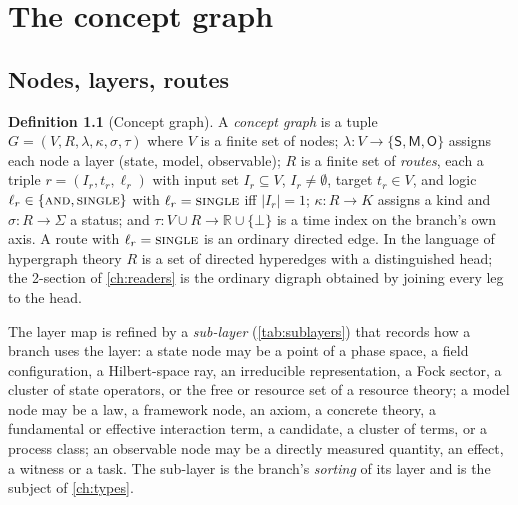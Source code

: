 \documentclass[11pt,a4paper,twoside,openany]{report}
\theoremstyle{plain}
\theoremstyle{definition}
\newtheorem{definition}[theorem]{Definition}
\theoremstyle{remark}
\newcommand{\lay}[1]{\mathsf{#1}}
\begin{document}
\chapter{The concept graph}\label{ch:graph}

\section{Nodes, layers, routes}
\begin{definition}[Concept graph]\label{def:graph}
A \emph{concept graph} is a tuple $G=(V,R,\lambda,\kappa,\sigma,\tau)$ where $V$ is a finite set of nodes; $\lambda\colon V\to\{\lay S,\lay M,\lay O\}$ assigns each node a layer (state, model, observable); $R$ is a finite set of \emph{routes}, each a triple $r=(I_r,t_r,\ell_r)$ with input set $I_r\subseteq V$, $I_r\neq\emptyset$, target $t_r\in V$, and logic $\ell_r\in\{\textsc{and},\textsc{single}\}$ with $\ell_r=\textsc{single}$ iff $|I_r|=1$; $\kappa\colon R\to K$ assigns a kind and $\sigma\colon R\to\Sigma$ a status; and $\tau\colon V\cup R\to\mathbb{R}\cup\{\bot\}$ is a time index on the branch's own axis. A route with $\ell_r=\textsc{single}$ is an ordinary directed edge. In the language of hypergraph theory \citep{berge1989,bretto2013} $R$ is a set of directed hyperedges with a distinguished head; the 2-section of \cref{ch:readers} is the ordinary digraph \citep{diestel2017} obtained by joining every leg to the head.
\end{definition}
The layer map is refined by a \emph{sub-layer} (\cref{tab:sublayers}) that records how a branch uses the layer: a state node may be a point of a phase space, a field configuration, a Hilbert-space ray, an irreducible representation, a Fock sector, a cluster of state operators, or the free or resource set of a resource theory; a model node may be a law, a framework node, an axiom, a concrete theory, a fundamental or effective interaction term, a candidate, a cluster of terms, or a process class; an observable node may be a directly measured quantity, an effect, a witness or a task. The sub-layer is the branch's \emph{sorting} of its layer and is the subject of \cref{ch:types}.
\end{document}
